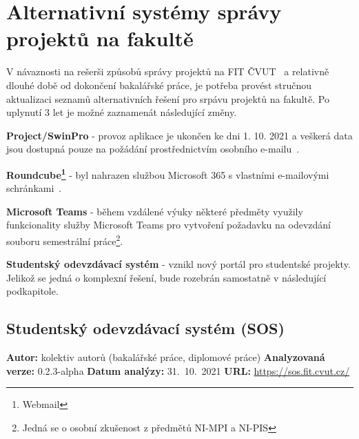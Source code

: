 \section{Alternativní systémy správy projektů na fakultě}

V návaznosti na rešerši způsobů správy projektů na \gls{FIT} \gls{ČVUT}~\cite{bachelorthesis} a relativně dlouhé době od dokončení bakalářské práce, je potřeba provést stručnou aktualizaci seznamů alternativních řešení pro srpávu projektů na fakultě.
Po uplynutí 3 let je možné zaznamenát následující změny.

\begin{ul}
   \item
   \textbf{Project/SwinPro} - provoz aplikace je ukončen ke dni 1. 10. 2021 a veškerá data jsou dostupná pouze na požádání prostřednictvím osobního e-mailu~\cite{swinpro}.
   \item
   \textbf{Roundcube\footnote{Webmail}} - byl nahrazen službou Microsoft 365 s vlastními e-mailovými schránkami~\cite{emailsfitcvut}.
   \item
   \textbf{Microsoft Teams} - během vzdálené výuky některé předměty využily funkcionality služby Microsoft Teams pro vytvoření požadavku na odevzdání souboru semestrální práce\footnote{Jedná se o osobní zkušenost z předmětů NI-MPI a NI-PIS}.
   \item
   \textbf{Studentský odevzdávací systém} - vznikl nový portál pro studentské projekty.
   Jelikož se jedná o komplexní řešení, bude rozebrán samostatně v následující podkapitole.
\end{ul}



\subsection{Studentský odevzdávací systém (SOS)}

\textbf{Autor:} kolektiv autorů (bakalářské práce, diplomové práce)\newline
\textbf{Analyzovaná verze:} 0.2.3-alpha\newline
\textbf{Datum analýzy:} 31.~10.~2021\newline
\textbf{URL:} \url{https://sos.fit.cvut.cz/}

